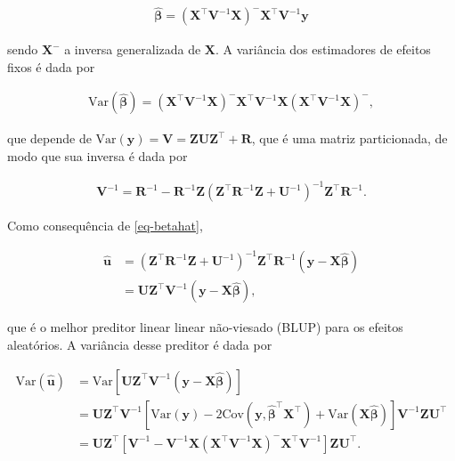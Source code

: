\documentclass[12pt, a4paper, twoside]{report}
\numberwithin{equation}{subsection} %
\begin{document}
\begin{align}
	\hat{\boldsymbol{\beta}} = \left( \mathbf{X}^\top\mathbf{V}^{-1}\mathbf{X} \right)^{-} \mathbf{X}^\top\mathbf{V}^{-1} \mathbf{y} \label{eq-betahat}
\end{align}

\noindent sendo $\mathbf{X}^{-}$ a inversa generalizada de $\mathbf{X}$. A variância dos estimadores de efeitos fixos é dada por

\begin{align}
	\text{Var}(\hat{\boldsymbol{\beta}}) = \left( \mathbf{X}^\top \mathbf{V}^{-1} \mathbf{X} \right)^{-} \mathbf{X}^\top \mathbf{V}^{-1} \mathbf{X} \left( \mathbf{X}^\top \mathbf{V}^{-1} \mathbf{X} \right)^{-},
\end{align}

\noindent que depende de $\text{Var}(\mathbf{y}) = \mathbf{V} = \mathbf{ZUZ}^\top + \mathbf{R}$, que é uma matriz particionada, de modo que sua inversa é dada por 

\begin{align}
	 \mathbf{V}^{-1} = \mathbf{R}^{-1} - \mathbf{R}^{-1} \mathbf{Z} \left( \mathbf{Z}^\top \mathbf{R}^{-1} \mathbf{Z} + \mathbf{U}^{-1} \right)^{-1} \mathbf{Z}^\top \mathbf{R}^{-1}.
\end{align}

\noindent Como consequência de \ref{eq-betahat}, 

\begin{align}
	\hat{\mathbf{u}} &= \left( \mathbf{Z}^\top \mathbf{R}^{-1} \mathbf{Z} + \mathbf{U}^{-1} \right)^{-1}\mathbf{Z}^\top \mathbf{R}^{-1} \left( \mathbf{y} - \mathbf{X} \hat{\boldsymbol{\beta}} \right) \nonumber \\
	&= \mathbf{UZ}^\top \mathbf{V}^{-1} \left( \mathbf{y} - \mathbf{X} \hat{\boldsymbol{\beta}} \right),
\end{align}

\noindent que é o melhor preditor linear linear não-viesado (BLUP) para os efeitos aleatórios. A variância desse preditor é dada por

\begin{align}
	\text{Var}(\hat{\mathbf{u}}) &= \text{Var} \left[ \mathbf{UZ}^\top \mathbf{V}^{-1} \left( \mathbf{y} - \mathbf{X} \hat{\boldsymbol{\beta}} \right) \right] \nonumber \\
	&= \mathbf{UZ}^\top \mathbf{V}^{-1} \left[ \text{Var}(\mathbf{y}) - 2\text{Cov}	\left(\mathbf{y}, \hat{\boldsymbol{\beta}}^\top \mathbf{X}^\top  \right) +  \text{Var}(\mathbf{X} \hat{\boldsymbol{\beta}})\right] \mathbf{V}^{-1} \mathbf{ZU}^\top \nonumber \\
	&= \mathbf{UZ}^\top \left[ \mathbf{V}^{-1} -  \mathbf{V}^{-1} \mathbf{X} \left( \mathbf{X}^\top \mathbf{V}^{-1} \mathbf{X} \right)^{-} \mathbf{X}^\top \mathbf{V}^{-1} \right]  \mathbf{ZU}^\top.
\end{align}
	
\end{document}
